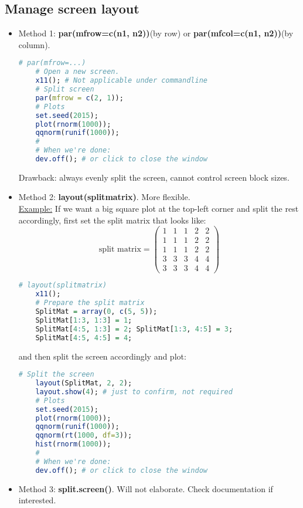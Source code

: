 \documentclass[10pt]{article}
\begin{document}
\subsection{Manage screen layout}
\begin{itemize}
	\item Method 1: {\bf par(mfrow=c(n1, n2))}(by row) or {\bf par(mfcol=c(n1, n2))}(by column).
\begin{lstlisting}[style=displaycode, language=R]
	# par(mfrow=...)
	# Open a new screen.
	x11(); # Not applicable under commandline
	# Split screen
	par(mfrow = c(2, 1)); 
	# Plots
	set.seed(2015);
	plot(rnorm(1000));
	qqnorm(runif(1000));
	#
	# When we're done:
	dev.off(); # or click to close the window
\end{lstlisting}
	Drawback: always evenly split the screen, cannot control screen block sizes.
	\item Method 2: {\bf layout(splitmatrix)}. More flexible.\\
	\underline{Example:} If we want a big square plot at the top-left corner and split the rest accordingly, first set the split matrix that looks like:
	\begin{equation*}
		\textrm{split matrix} = 
		\begin{pmatrix}
		1&1&1&2&2\\
		1&1&1&2&2\\
		1&1&1&2&2\\
		3&3&3&4&4\\
		3&3&3&4&4
		\end{pmatrix}
	\end{equation*}
\begin{lstlisting}[style=displaycode, language=R]
	# layout(splitmatrix)
	x11();
	# Prepare the split matrix
	SplitMat = array(0, c(5, 5));
	SplitMat[1:3, 1:3] = 1;
	SplitMat[4:5, 1:3] = 2; SplitMat[1:3, 4:5] = 3;
	SplitMat[4:5, 4:5] = 4;
\end{lstlisting}
	and then split the screen accordingly and plot:
\begin{lstlisting}[style=displaycode, language=R]
	# Split the screen
	layout(SplitMat, 2, 2);
	layout.show(4); # just to confirm, not required
	# Plots
	set.seed(2015);
	plot(rnorm(1000));
	qqnorm(runif(1000));
	qqnorm(rt(1000, df=3));
	hist(rnorm(1000));
	#
	# When we're done:
	dev.off(); # or click to close the window
\end{lstlisting}
	\item Method 3: {\bf split.screen()}. Will not elaborate. Check documentation if interested.
\end{itemize}
\end{document}
